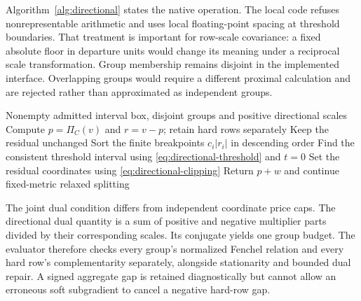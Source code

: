 Algorithm~\ref{alg:directional} states the native operation. The local code
refuses nonrepresentable arithmetic and uses local floating-point spacing at
threshold boundaries. That treatment is important for row-scale covariance:
a fixed absolute floor in departure units would change its meaning under a
reciprocal scale transformation. Group membership remains disjoint in the
implemented interface. Overlapping groups would require a different proximal
calculation and are rejected rather than approximated as independent groups.

\begin{algorithm}[htbp]
\caption{Compute an exact directional group proximal operation in a fixed positive diagonal metric, with explicit free-price, threshold-endpoint and representability handling.}\label{alg:directional}
\begin{algorithmic}[1]
\Require Nonempty admitted interval box, disjoint groups and positive directional scales
\State Compute $p=\Pi_C(v)$ and $r=v-p$; retain hard rows separately
\State Keep the residual unchanged
\Else
\State Sort the finite breakpoints $c_i|r_i|$ in descending order
\State Find the consistent threshold interval using \eqref{eq:directional-threshold} and $t=0$
\State Set the residual coordinates using \eqref{eq:directional-clipping}
\EndIf
\EndFor
\State Return $p+w$ and continue fixed-metric relaxed splitting
\end{algorithmic}
\end{algorithm}

The joint dual condition differs from independent coordinate price caps. The
directional dual quantity is a sum of positive and negative multiplier parts
divided by their corresponding scales. Its conjugate yields one group budget.
The evaluator therefore checks every group's normalized Fenchel relation and
every hard row's complementarity separately, alongside stationarity and bounded
dual repair. A signed aggregate gap is retained diagnostically but cannot
allow an erroneous soft subgradient to cancel a negative hard-row gap.

